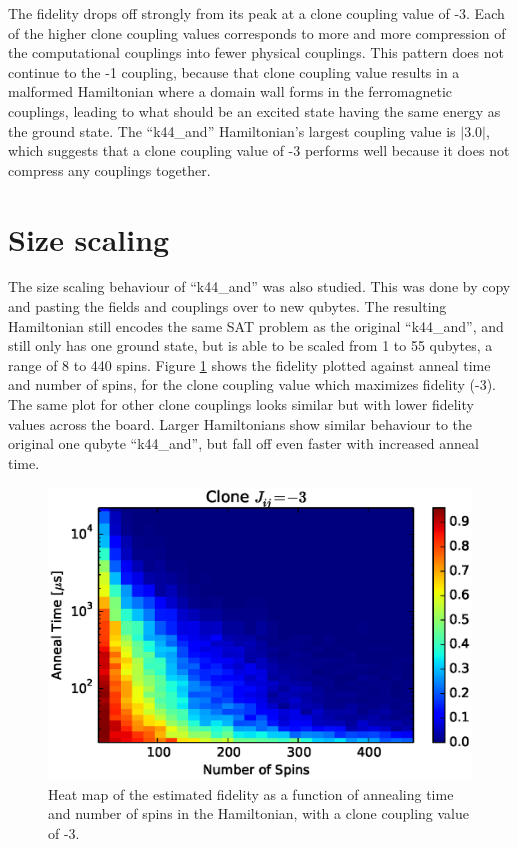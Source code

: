 The fidelity drops off strongly from its peak at a clone coupling value of -3.  Each of the higher clone coupling values corresponds to more and more compression of the computational couplings into fewer physical couplings.  This pattern does not continue to the -1 coupling, because that clone coupling value results in a malformed Hamiltonian where a domain wall forms in the ferromagnetic couplings, leading to what should be an excited state having the same energy as the ground state.  The ``k44\_and'' Hamiltonian's largest coupling value is $|3.0|$, which suggests that a clone coupling value of -3 performs well because it does not compress any couplings together.

\section{Size scaling}
The size scaling behaviour of ``k44\_and'' was also studied.  This was done by copy and pasting the fields and couplings over to new qubytes.  The resulting Hamiltonian still encodes the same SAT problem as the original ``k44\_and'', and still only has one ground state, but is able to be scaled from 1 to 55 qubytes, a range of 8 to 440 spins.  Figure \ref{fig:time_spins} shows the fidelity plotted against anneal time and number of spins, for the clone coupling value which maximizes fidelity (-3).  The same plot for other clone couplings looks similar but with lower fidelity values across the board.  Larger Hamiltonians show similar behaviour to the original one qubyte ``k44\_and'', but fall off even faster with increased anneal time.

\begin{figure}
	\includegraphics{img/pcolor_c_3.eps}
	\caption[Fidelity vs Time vs Number of Qubits]{Heat map of the estimated fidelity as a function of annealing time and number of spins in the Hamiltonian, with a clone coupling value of -3.}
	\label{fig:time_spins}
\end{figure}

